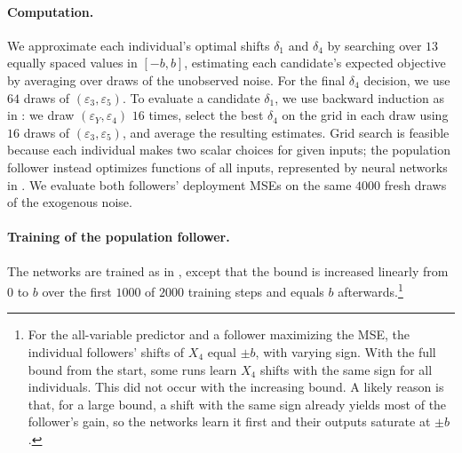 {\paragraph{Computation.}
We approximate each individual's optimal shifts $\delta_1$ and $\delta_4$ by searching over $13$ equally spaced values in $[-b, b]$, estimating each candidate's expected objective by averaging over draws of the unobserved noise.
For the final $\delta_4$ decision, we use $64$ draws of $(\varepsilon_3, \varepsilon_5)$.
To evaluate a candidate $\delta_1$, we use backward induction as in : we draw $(\varepsilon_Y, \varepsilon_4)$ $16$ times, select the best $\delta_4$ on the grid in each draw using $16$ draws of $(\varepsilon_3, \varepsilon_5)$, and average the resulting estimates.
Grid search is feasible because each individual makes two scalar choices for given inputs; the population follower instead optimizes functions of all inputs, represented by neural networks in .
We evaluate both followers' deployment MSEs on the same $4000$ fresh draws of the exogenous noise.

\paragraph{Training of the population follower.}
The networks are trained as in , except that the bound is increased linearly from $0$ to $b$ over the first $1000$ of $2000$ training steps and equals $b$ afterwards.\footnote{%
For the all-variable predictor and a follower maximizing the MSE, the individual followers' shifts of $X_4$ equal $\pm b$, with varying sign.
With the full bound from the start, some runs learn $X_4$ shifts with the same sign for all individuals.
This did not occur with the increasing bound.
A likely reason is that, for a large bound, a shift with the same sign already yields most of the follower's gain, so the networks learn it first and their outputs saturate at $\pm b$.}


}
